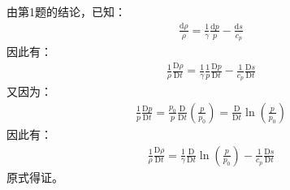 \begin{enumerate}
        由第1题的结论，已知：
        \begin{gather}
            \frac{\mathrm{d} \rho}{\rho}=\frac{1}{\gamma} \frac{\mathrm{d} p}{p}-\frac{\mathrm{d} s}{c_{p}}
        \end{gather}
        因此有：
        \begin{gather}
            \frac{1}{\rho} \frac{\mathrm{D} \rho}{\mathrm{D} t}
            =\frac{1}{\gamma} \frac{1}{p} \frac{\mathrm{D} p}{\mathrm{D} t}-\frac{1}{c_{p}} \frac{\mathrm{D} s}{\mathrm{D} t}
        \end{gather}
        又因为：
        \begin{equation}
            \begin{aligned}
                \frac{1}{p} \frac{\mathrm{D} p}{\mathrm{D} t} 
                = \frac{p_{0}}{p} \frac{\mathrm{D}}{\mathrm{D} t} ( \frac{p}{p_{0}} )
                = \frac{\mathrm{D}}{\mathrm{D} t} \ln ( \frac{p}{p_{0}} )
            \end{aligned}
        \end{equation}
        因此有：
        \begin{gather}
            \frac{1}{\rho} \frac{\mathrm{D} \rho}{\mathrm{D} t}=\frac{1}{\gamma} \frac{\mathrm{D}}{\mathrm{D} t} \ln \left(\frac{p}{p_{0}}\right)-\frac{1}{c_{p}} \frac{\mathrm{D} s}{\mathrm{D} t}
        \end{gather}
        原式得证。
\end{enumerate}

\clearpage